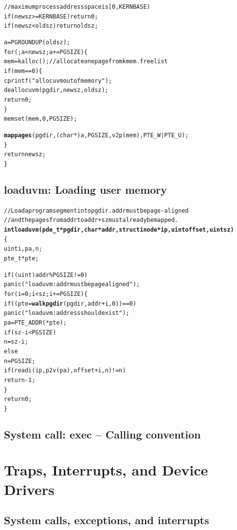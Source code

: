 \documentclass{note}
\begin{document}
{\begin{alltt}
    // maximum process address space is [0, KERNBASE)
    if(newsz >= KERNBASE) return 0;
    if(newsz < oldsz) return oldsz;

    a = PGROUNDUP(oldsz);
    for (; a < newsz; a += PGSIZE) \{
      mem = kalloc();  // allocate one page from kmem.freelist
      if(mem == 0) \{
        cprintf("allocuvm out of memory");
        deallocuvm(pgdir, newsz, oldsz);
        return 0;
      \}
      memset(mem, 0, PGSIZE);
  
      \textcolor{red2}{\textbf{mappages}}(pgdir, (char*)a, PGSIZE, v2p(mem), PTE_W|PTE_U);
    \}
    return newsz;
  \}
\end{alltt}

\subsection{loaduvm: Loading user memory}
\begin{alltt}
\textcolor{red2}{  // Load a program segment into pgdir.  addr must be page-aligned
  // and the pages from addr to addr+sz must already be mapped.}
  \textcolor{red2}{\textbf{int loaduvm(pde_t *pgdir, char *addr, struct inode *ip, uint offset, uint sz)}}
  \{
    uint i, pa, n;
    pte_t *pte;

    if ((uint) addr \% PGSIZE != 0)
      panic("loaduvm: addr must be page aligned");
    for (i = 0; i < sz; i += PGSIZE) \{
      if ((pte = \textcolor{red2}{\textbf{walkpgdir}}(pgdir, addr+i, 0)) == 0)
        panic("loaduvm: address should exist");
      pa = PTE_ADDR(*pte);
      if (sz - i < PGSIZE)
        n = sz - i;
      else
        n = PGSIZE;
      if (readi(ip, p2v(pa), offset+i, n) != n)
        return -1;
    \}
    return 0;
  \}
\end{alltt}


\subsection{System call: exec -- Calling convention}

\pagebreak
\section{Traps, Interrupts, and Device Drivers}

\subsection{System calls, exceptions, and interrupts}

}
\end{document}
